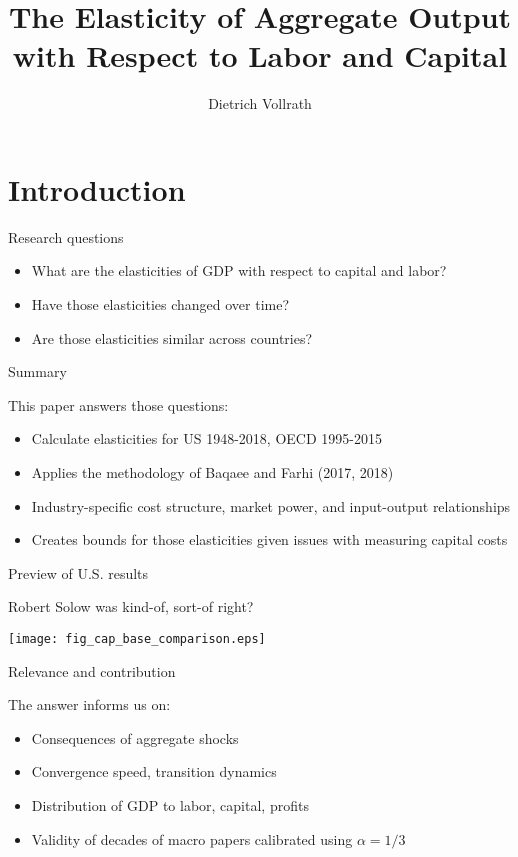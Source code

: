 \documentclass[10pt, xcolor=dvipsnames]{beamer}
\title[Aggregate elasticities]{The Elasticity of Aggregate Output with Respect to Labor and Capital}
\author[Vollrath]{Dietrich Vollrath \inst{1}}
\institute[UH]{\inst{1} University of Houston}
\date[April 2022]{}
\begin{document}
\maketitle

\section{Introduction}

\begin{frame}{Research questions}\label{define}

\begin{itemize}
  \item What are the elasticities of GDP with respect to capital and labor?
  \item Have those elasticities changed over time?
  \item Are those elasticities similar across countries? 
\end{itemize}

\end{frame}

\begin{frame}{Summary}

This paper answers those questions:
\begin{itemize}
  \item Calculate elasticities for US 1948-2018, OECD 1995-2015
  \item Applies the methodology of Baqaee and Farhi (2017, 2018)
  \item Industry-specific cost structure, market power, and input-output relationships
  \item Creates bounds for those elasticities given issues with measuring capital costs
\end{itemize}

\end{frame}

\begin{frame}{Preview of U.S. results}

Robert Solow was kind-of, sort-of right?

\begin{center}
\texttt{[image: fig\_cap\_base\_comparison.eps]}
\end{center}

\end{frame}

\begin{frame}{Relevance and contribution}

The answer informs us on:
\begin{itemize}
  \item Consequences of aggregate shocks
  \item Convergence speed, transition dynamics
  \item Distribution of GDP to labor, capital, profits
  \item Validity of decades of macro papers calibrated using $\alpha = 1/3$
\end{itemize}

\end{frame}
\end{document}
